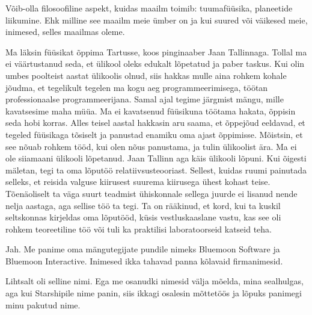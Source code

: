 
Võib-olla filosoofiline aspekt, kuidas 
maailm toimib: tuumafüüsika, planeetide liikumine. Ehk milline see maailm meie 
ümber on ja kui suured või väikesed meie, inimesed, selles maailmas oleme. 


Ma läksin füüsikat õppima Tartusse, koos pinginaaber Jaan 
Tallinnaga. Tollal ma ei väärtustanud seda, 
et ülikool oleks   
edukalt lõpetatud ja paber taskus. Kui olin umbes poolteist aastat ülikoolis 
olnud, siis hakkas mulle aina rohkem kohale jõudma, et tegelikult tegelen ma 
kogu aeg programmeerimisega, töötan professionaalse programmeerijana. 
Samal ajal tegime järgmist mängu, mille kavatsesime maha müüa. Ma ei kavatsenud 
füüsikuna töötama hakata, õppisin seda hobi 
korras. Alles teisel aastal hakkasin aru saama, et õppejõud eeldavad, 
et tegeled füüsikaga tõsiselt ja panustad enamiku oma ajast õppimisse. 
Mõistsin, et see nõuab rohkem 
tööd, kui olen nõus panustama, ja tulin ülikoolist ära. Ma ei ole siiamaani 
ülikooli lõpetanud. Jaan Tallinn aga käis ülikooli 
lõpuni. Kui õigesti mäletan, tegi ta oma lõputöö 
relatiivsusteooriast. Sellest, kuidas ruumi painutada selleks, et reisida 
valguse kiirusest suurema kiirusega ühest kohast teise. 
Tõenäoliselt ta väga suurt teadmist ühiskonnale sellega juurde 
ei lisanud nende nelja aastaga, aga sellise töö ta tegi. Ta 
on rääkinud, et kord, kui ta kuskil seltskonnas kirjeldas oma lõputööd, 
küsis vestluskaaslane vastu, kas see oli 
rohkem teoreetiline töö või tuli ka praktilisi laboratoorseid katseid teha.

\label{sisu!bluemoon}

Jah. Me panime oma mängutegijate pundile nimeks Bluemoon 
Software ja Bluemoon Interactive. Inimesed ikka tahavad panna 
kõlavaid firmanimesid.


Lihtsalt oli selline nimi. Ega me osanudki nimesid välja mõelda, mina 
sealhulgas, aga kui Starshipile nime panin, siis ikkagi osalesin mõttetöös ja lõpuks panimegi 
minu pakutud nime.


